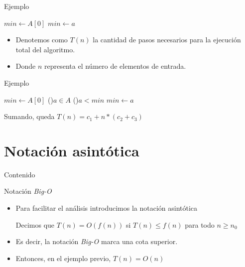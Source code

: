 \documentclass[handout]{beamer}
\begin{document}
\begin{frame}{Ejemplo}
  \begin{algorithm}[H]
    \BlankLine
    $min \leftarrow A[0]$\;
    {
      {
        $min \leftarrow a$
      }
    }
  \end{algorithm}
\end{frame}

\begin{frame}
\begin{itemize}
  \item Denotemos como $T(n)$ la cantidad de pasos necesarios para la ejecuci\'on total del algoritmo.
\pause
  \item Donde $n$ representa el n\'umero de elementos de entrada.
\end{itemize}
\end{frame}

\begin{frame}{Ejemplo}
  \begin{algorithm}[H]
    \BlankLine
    $min \leftarrow A[0]$ 
    \For(){$a \in A$}
    {
      \If(){$a<min$}
      {
        $min \leftarrow a$ 
      }
    }
  \end{algorithm}
\pause
Sumando, queda $T(n) = c_1 + n*(c_2 + c_3)$
\end{frame}

\section{Notaci\'on asint\'otica}
\begin{frame}{Contenido}
\tableofcontents[currentsection]
\end{frame}

\begin{frame}{Notaci\'on \textit{Big-O}}
\begin{itemize}
  \item Para facilitar el an\'alisis introducimos la notaci\'on asint\'otica
\pause
\begin{definition}
Decimos que $T(n)=O(f(n))$ si $T(n)\leq f(n)$ para todo $n\geq n_0$
\end{definition}
\pause
  \item Es decir, la notaci\'on \textit{Big-O} marca una cota superior.
\pause
  \item Entonces, en el ejemplo previo, $T(n)=O(n)$
\end{itemize}
\end{frame}
\end{document}
